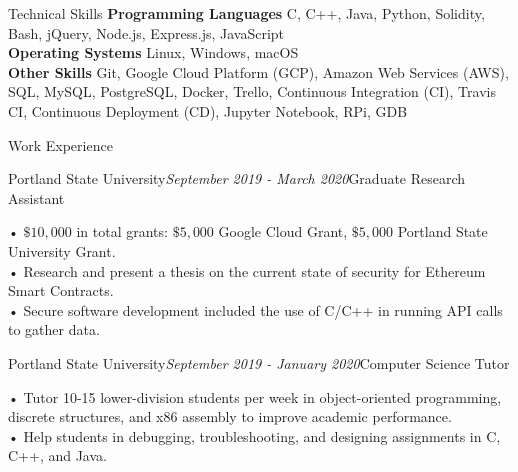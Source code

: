 \documentclass{resume} %
\begin{document}
\begin{rSection}{Technical Skills}
  {\bf{Programming Languages}} C, C++, Java, Python, Solidity, Bash, jQuery, Node.js, Express.js, JavaScript\\
  {\bf{Operating Systems}} Linux, Windows, macOS\\
  {\bf{Other Skills}} Git, Google Cloud Platform (GCP), Amazon Web Services (AWS), SQL, MySQL, PostgreSQL, Docker, Trello, Continuous Integration (CI), Travis CI, Continuous Deployment (CD), Jupyter Notebook, RPi, GDB

\end{rSection}


\begin{rSection}{Work Experience}

  \begin{rSubsection}{Portland State University}{{\em{September 2019 - March 2020}}}{Graduate Research Assistant}{}
\item • $\$10,000$ in total grants: $\$5,000$ Google Cloud Grant, $\$5,000$ Portland State University Grant.
  \\• Research and present a thesis on the current state of security for Ethereum Smart Contracts.
  \\• Secure software development included the use of C/C++ in running API calls to gather data.
\end{rSubsection}

  \begin{rSubsection}{Portland State University}{{\em{September 2019 - January 2020}}}{Computer Science Tutor}{}
\item • Tutor 10-15 lower-division students per week in object-oriented programming, discrete structures, and x86 assembly to improve academic performance.
\\• Help students in debugging, troubleshooting, and designing assignments in C, C++, and Java.
\end{rSubsection}

\end{rSection}

\end{document}
